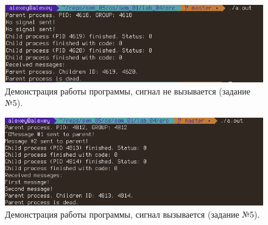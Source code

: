 \documentclass[12pt]{report}
\begin{document}
\begin{figure}[H]

	\centering

	\includegraphics[width=\linewidth]{img/task05_01.png}
	\caption{Демонстрация работы программы, сигнал не вызывается (задание №5).}

	\label{fig:task05_01}

\end{figure}

\begin{figure}[H]

	\centering

	\includegraphics[width=\linewidth]{img/task05_02.png}
	\caption{Демонстрация работы программы, сигнал вызывается (задание №5).}

	\label{fig:task05_02}

\end{figure}



\end{document}
